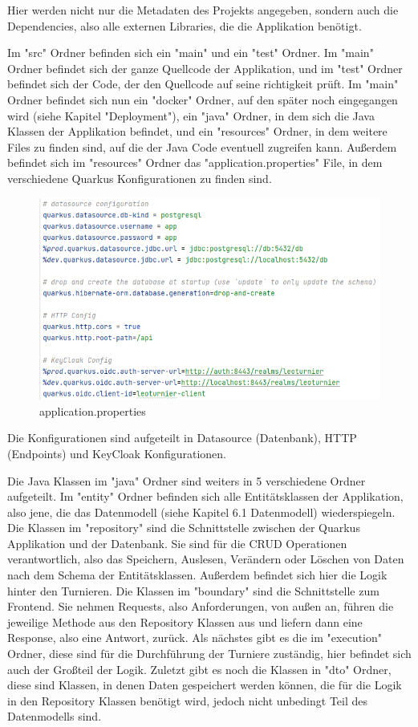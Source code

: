 Hier werden nicht nur die Metadaten des Projekts angegeben, sondern auch die Dependencies, also alle externen Libraries, die die Applikation benötigt. 

Im "src" Ordner befinden sich ein "main" und ein "test" Ordner. Im "main" Ordner befindet sich der ganze Quellcode der Applikation, und im "test" Ordner befindet sich der Code, der den Quellcode auf seine richtigkeit prüft.
Im "main" Ordner befindet sich nun ein "docker" Ordner, auf den später noch eingegangen wird (siehe Kapitel "Deployment"), ein "java" Ordner, in dem sich die Java Klassen der Applikation befindet, und ein "resources" Ordner, in dem weitere Files zu finden sind, 
auf die der Java Code eventuell zugreifen kann. Außerdem befindet sich im "resources" Ordner das "application.properties" File, in dem verschiedene Quarkus Konfigurationen zu finden sind.

\begin{figure}[H]
    \includegraphics[scale=0.6]{pics/backend/application.properties.png}
    \caption{application.properties}
\end{figure}

Die Konfigurationen sind aufgeteilt in Datasource (Datenbank), HTTP (Endpoints) und KeyCloak Konfigurationen. 

Die Java Klassen im "java" Ordner sind weiters in 5 verschiedene Ordner aufgeteilt. Im "entity" Ordner befinden sich alle Entitätsklassen der Applikation, also jene, die das Datenmodell (siehe Kapitel 6.1 Datenmodell) wiederspiegeln.
Die Klassen im "repository" sind die Schnittstelle zwischen der Quarkus Applikation und der Datenbank. Sie sind für die CRUD Operationen verantwortlich, also das Speichern, Auslesen, Verändern oder Löschen von Daten nach dem Schema der Entitätsklassen.
Außerdem befindet sich hier die Logik hinter den Turnieren. Die Klassen im "boundary" sind die Schnittstelle zum Frontend. Sie nehmen Requests, also Anforderungen, von außen an, 
führen die jeweilige Methode aus den Repository Klassen aus und liefern dann eine Response, also eine Antwort, zurück. Als nächstes gibt es die im "execution" Ordner, diese sind für die Durchführung der Turniere zuständig, hier befindet sich auch der Großteil der Logik. 
Zuletzt gibt es noch die Klassen in "dto" Ordner, diese sind Klassen, in denen Daten gespeichert werden können, die für die Logik in den Repository Klassen benötigt wird, jedoch nicht unbedingt Teil des Datenmodells sind.

